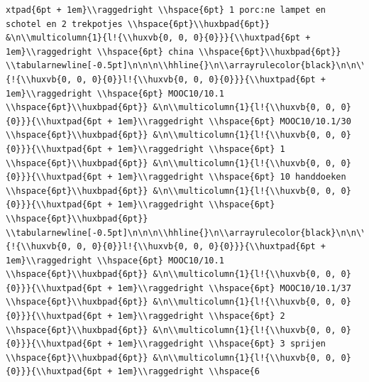 \documentclass[11pt,preprint, authoryear]{elsarticle}
\numberwithin{equation}{section}
\numberwithin{figure}{section}
\numberwithin{table}{section}
\begin{document}
\begin{verbatim}
xtpad{6pt + 1em}\\raggedright \\hspace{6pt} 1 porc:ne lampet en schotel en 2 trekpotjes \\hspace{6pt}\\huxbpad{6pt}} &\n\\multicolumn{1}{l!{\\huxvb{0, 0, 0}{0}}}{\\huxtpad{6pt + 1em}\\raggedright \\hspace{6pt} china \\hspace{6pt}\\huxbpad{6pt}} \\tabularnewline[-0.5pt]\n\n\n\\hhline{}\n\\arrayrulecolor{black}\n\n\\multicolumn{1}{!{\\huxvb{0, 0, 0}{0}}l!{\\huxvb{0, 0, 0}{0}}}{\\huxtpad{6pt + 1em}\\raggedright \\hspace{6pt} MOOC10/10.1 \\hspace{6pt}\\huxbpad{6pt}} &\n\\multicolumn{1}{l!{\\huxvb{0, 0, 0}{0}}}{\\huxtpad{6pt + 1em}\\raggedright \\hspace{6pt} MOOC10/10.1/30 \\hspace{6pt}\\huxbpad{6pt}} &\n\\multicolumn{1}{l!{\\huxvb{0, 0, 0}{0}}}{\\huxtpad{6pt + 1em}\\raggedright \\hspace{6pt} 1 \\hspace{6pt}\\huxbpad{6pt}} &\n\\multicolumn{1}{l!{\\huxvb{0, 0, 0}{0}}}{\\huxtpad{6pt + 1em}\\raggedright \\hspace{6pt} 10 handdoeken \\hspace{6pt}\\huxbpad{6pt}} &\n\\multicolumn{1}{l!{\\huxvb{0, 0, 0}{0}}}{\\huxtpad{6pt + 1em}\\raggedright \\hspace{6pt}  \\hspace{6pt}\\huxbpad{6pt}} \\tabularnewline[-0.5pt]\n\n\n\\hhline{}\n\\arrayrulecolor{black}\n\n\\multicolumn{1}{!{\\huxvb{0, 0, 0}{0}}l!{\\huxvb{0, 0, 0}{0}}}{\\huxtpad{6pt + 1em}\\raggedright \\hspace{6pt} MOOC10/10.1 \\hspace{6pt}\\huxbpad{6pt}} &\n\\multicolumn{1}{l!{\\huxvb{0, 0, 0}{0}}}{\\huxtpad{6pt + 1em}\\raggedright \\hspace{6pt} MOOC10/10.1/37 \\hspace{6pt}\\huxbpad{6pt}} &\n\\multicolumn{1}{l!{\\huxvb{0, 0, 0}{0}}}{\\huxtpad{6pt + 1em}\\raggedright \\hspace{6pt} 2 \\hspace{6pt}\\huxbpad{6pt}} &\n\\multicolumn{1}{l!{\\huxvb{0, 0, 0}{0}}}{\\huxtpad{6pt + 1em}\\raggedright \\hspace{6pt} 3 sprijen \\hspace{6pt}\\huxbpad{6pt}} &\n\\multicolumn{1}{l!{\\huxvb{0, 0, 0}{0}}}{\\huxtpad{6pt + 1em}\\raggedright \\hspace{6
\end{verbatim}
\end{document}
